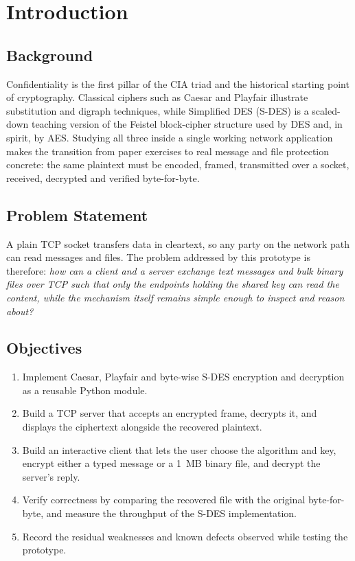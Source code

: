 \chapter{Introduction}

\section{Background}
Confidentiality is the first pillar of the CIA triad and the historical starting
point of cryptography. Classical ciphers such as Caesar and Playfair illustrate
substitution and digraph techniques, while Simplified DES (S-DES) is a scaled-down
teaching version of the Feistel block-cipher structure used by DES and, in spirit,
by AES. Studying all three inside a single working network application makes the
transition from paper exercises to real message and file protection concrete: the
same plaintext must be encoded, framed, transmitted over a socket, received,
decrypted and verified byte-for-byte.

\section{Problem Statement}
A plain TCP socket transfers data in cleartext, so any party on the network path
can read messages and files. The problem addressed by this prototype is therefore:
\emph{how can a client and a server exchange text messages and bulk binary files
over TCP such that only the endpoints holding the shared key can read the
content, while the mechanism itself remains simple enough to inspect and reason
about?}

\section{Objectives}
\begin{enumerate}
  \item Implement Caesar, Playfair and byte-wise S-DES encryption and decryption
        as a reusable Python module.
  \item Build a TCP server that accepts an encrypted frame, decrypts it, and
        displays the ciphertext alongside the recovered plaintext.
  \item Build an interactive client that lets the user choose the algorithm and
        key, encrypt either a typed message or a 1~MB binary file, and decrypt the
        server's reply.
  \item Verify correctness by comparing the recovered file with the original
        byte-for-byte, and measure the throughput of the S-DES implementation.
  \item Record the residual weaknesses and known defects observed while testing
        the prototype.
\end{enumerate}

